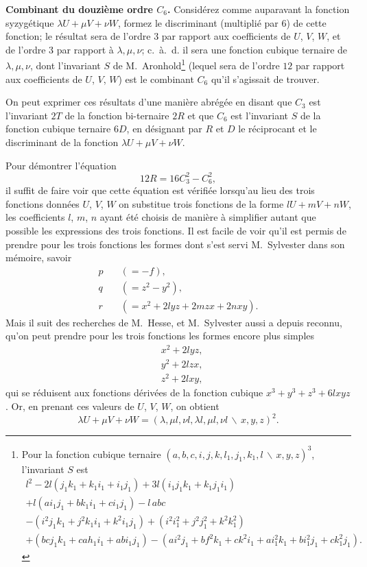 \documentclass[11pt,a4paper]{book}
\begin{document}
\textbf{Combinant du douzi\`{e}me ordre $C_{6}$.} Consid\'{e}rez comme auparavant la fonction
syzyg\'{e}tique $\lambda U + \mu V + \nu W$, formez le discriminant (multipli\'{e} par $6$) de
 cette fonction; le r\'{e}sultat sera de l'ordre $3$ par rapport aux coefficients de $U$, $V$, $W$,
et de l'ordre $3$ par rapport \`{a} $\lambda, \mu, \nu$; c.~\`{a}.~d. il sera une fonction cubique
ternaire de $\lambda, \mu, \nu$, dont l'invariant $S$ de M.~Aronhold\footnote{Pour la fonction
cubique ternaire $(a,b,c,i,j,k,l_{1},j_{1},k_{1},l\,\backslash\!\!\,x,y,z)^{3}$, l'invariant $S$ est
\begin{multline*}
l^{2} - 2l(j_{1}k_{1}+k_{1}i_{1}+i_{1}j_{1}) + 3l(i_{1}j_{1}k_{1}+k_{1}j_{1}i_{1}) \\
+ l(ai_{1}j_{1}+bk_{1}i_{1}+ci_{1}j_{1}) - l\,abc \\
- (i^{2}j_{1}k_{1}+j^{2}k_{1}i_{1}+k^{2}i_{1}j_{1})
+ (i^{2}i_{1}^{2}+j^{2}j_{1}^{2}+k^{2}k_{1}^{2}) \\
+ (bcj_{1}k_{1}+cah_{1}i_{1}+abi_{1}j_{1})
- (ai^{2}j_{1}+bf^{2}k_{1}+ck^{2}i_{1}+ai_{1}^{2}k_{1}+bi_{1}^{2}j_{1}+ck_{1}^{2}j_{1}).
\end{multline*}}
(lequel sera de l'ordre $12$ par rapport aux coefficients de $U$, $V$, $W$) est le
combinant $C_{6}$ qu'il s'agissait de trouver.

On peut exprimer ces r\'{e}sultats d'une mani\`{e}re abr\'{e}g\'{e}e en disant que $C_{3}$ est
l'invariant $2T$ de la fonction bi-ternaire $2R$ et que $C_{6}$ est l'invariant $S$ de la
fonction cubique ternaire $6D$, en d\'{e}signant par $R$ et $D$ le r\'{e}ciprocant et le
discriminant de la fonction $\lambda U + \mu V + \nu W$.

Pour d\'{e}montrer l'\'{e}quation
\[12R = 16C_{3}^{2} - C_{6}^{2},\]
il suffit de faire voir que cette \'{e}quation est v\'{e}rifi\'{e}e lorsqu'au lieu des trois fonctions
donn\'{e}es $U$, $V$, $W$ on substitue trois fonctions de la forme $lU + mV + nW$, les
coefficients $l$, $m$, $n$ ayant \'{e}t\'{e} choisis de mani\`{e}re \`{a} simplifier autant que possible les
expressions des trois fonctions. Il est facile de voir qu'il est permis de prendre pour
les trois fonctions les formes dont s'est servi M.~Sylvester dans son m\'{e}moire, savoir
\[
\begin{aligned}
p\quad &(= -f),\\
q\quad &(= z^{2} - y^{2}),\\
r\quad &(= x^{2} + 2lyz + 2mzx + 2nxy).
\end{aligned}
\]
Mais il suit des recherches de M.~Hesse, et M.~Sylvester aussi a depuis reconnu, qu'on
peut prendre pour les trois fonctions les formes encore plus simples
\[
\begin{aligned}
&x^{2} + 2lyz,\\
&y^{2} + 2lzx,\\
&z^{2} + 2lxy,
\end{aligned}
\]
qui se r\'{e}duisent aux fonctions d\'{e}riv\'{e}es de la fonction cubique $x^{3} + y^{3} + z^{3} + 6lxyz$.
Or, en prenant ces valeurs de $U$, $V$, $W$, on obtient
\[\lambda U + \mu V + \nu W = (\lambda, \mu l, \nu l, \lambda l, \mu l, \nu l\,\backslash\!\!\,x,y,z)^{2}.\]
\end{document}
